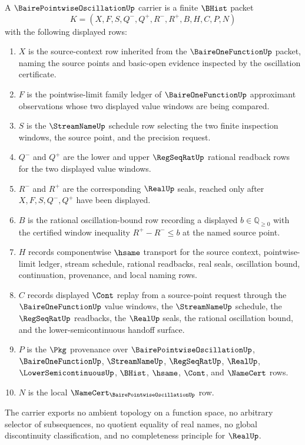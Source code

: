 \begin{definition}
\label{def:baire-pointwise-oscillation-carrier}
A $\BairePointwiseOscillationUp$ carrier is a finite $\BHist$ packet
$$
K=(X,F,S,Q^-,Q^+,R^-,R^+,B,H,C,P,N)
$$
with the following displayed rows:
\begin{enumerate}
\item $X$ is the source-context row inherited from the $\BaireOneFunctionUp$ packet, naming the source points and basic-open evidence inspected by the oscillation certificate.
\item $F$ is the pointwise-limit family ledger of $\BaireOneFunctionUp$ approximant observations whose two displayed value windows are being compared.
\item $S$ is the $\StreamNameUp$ schedule row selecting the two finite inspection windows, the source point, and the precision request.
\item $Q^-$ and $Q^+$ are the lower and upper $\RegSeqRatUp$ rational readback rows for the two displayed value windows.
\item $R^-$ and $R^+$ are the corresponding $\RealUp$ seals, reached only after $X,F,S,Q^-,Q^+$ have been displayed.
\item $B$ is the rational oscillation-bound row recording a displayed $b\in\mathbb{Q}_{\ge 0}$ with the certified window inequality $R^+ - R^- \leq b$ at the named source point.
\item $H$ records componentwise $\hsame$ transport for the source context, pointwise-limit ledger, stream schedule, rational readbacks, real seals, oscillation bound, continuation, provenance, and local naming rows.
\item $C$ records displayed $\Cont$ replay from a source-point request through the $\BaireOneFunctionUp$ value windows, the $\StreamNameUp$ schedule, the $\RegSeqRatUp$ readbacks, the $\RealUp$ seals, the rational oscillation bound, and the lower-semicontinuous handoff surface.
\item $P$ is the $\Pkg$ provenance over $\BairePointwiseOscillationUp$, $\BaireOneFunctionUp$, $\StreamNameUp$, $\RegSeqRatUp$, $\RealUp$, $\LowerSemicontinuousUp$, $\BHist$, $\hsame$, $\Cont$, and $\NameCert$ rows.
\item $N$ is the local $\NameCert_{\BairePointwiseOscillationUp}$ row.
\end{enumerate}
The carrier exports no ambient topology on a function space, no arbitrary selector of subsequences, no quotient equality of real names, no global discontinuity classification, and no completeness principle for $\RealUp$.
\end{definition}

